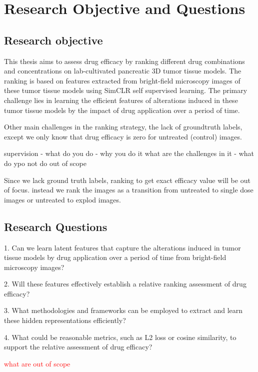 \chapter{Research Objective and Questions}\label{ch:Research Objectives and Questions}
\section*{Research objective}
This thesis aims to assess drug efficacy by ranking different drug combinations and concentrations on lab-cultivated pancreatic 3D tumor tissue models. 
The ranking is based on features extracted from bright-field microscopy images of these tumor tissue models using
SimCLR self supervised learning. The primary challenge lies in learning the efficient features of alterations induced in these
tumor tissue models by the impact of drug application over a period of time.

Other main challenges in the ranking strategy, the lack of groundtruth labels, except we only know that drug efficacy is zero for untreated (control) images.


supervision
- what do you do 
- why you do it
what are the challenges in it
- what do ypo not do out of scope

Since we lack ground truth labels, ranking to get exact efficacy value will be out of focus. 
instead we rank the images as a transition from
untreated to single dose images or untreated to explod images. 







\section*{Research Questions}

1. Can we learn latent features that capture the alterations induced in tumor tissue models by drug application over a period of time from bright-field microscopy images?

2. Will these features effectively establish a relative ranking assessment of drug efficacy?

3. What methodologies and frameworks can be employed to extract and learn these hidden representations efficiently?

4. What could be reasonable metrics, such as L2 loss or cosine similarity, to support the relative assessment of drug efficacy?


\textcolor{red}{what are out of scope}
